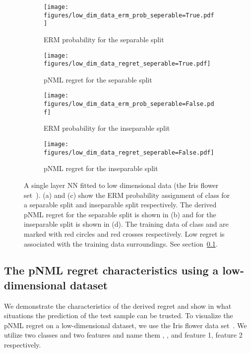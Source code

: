 \documentclass{article}
\def\secref#1{section~\ref{#1}}
\begin{document}
\begin{figure}[tbh]
    \centering
\begin{subfigure}[t]{0.49\linewidth}
    \texttt{[image: figures/low\_dim\_data\_erm\_prob\_seperable=True.pdf]}
    \vspace{-8mm}
    \caption{ERM probability for the separable split\label{fig:syntetic_erm_prob}}
\end{subfigure}
\begin{subfigure}[t]{0.49\linewidth}
    \texttt{[image: figures/low\_dim\_data\_regret\_seperable=True.pdf]}
    \vspace{-8mm}
    \caption{pNML regret for the separable split\ \label{fig:syntetic_regret}}
\end{subfigure}
\begin{subfigure}[t]{0.49\linewidth}
    \texttt{[image: figures/low\_dim\_data\_erm\_prob\_seperable=False.pdf]}
    \vspace{-8mm}
    \caption{ERM probability for the inseparable split\  \label{fig:syntetic_erm_prob_inseparable}}
\end{subfigure}
\begin{subfigure}[t]{0.49\linewidth}
    \texttt{[image: figures/low\_dim\_data\_regret\_seperable=False.pdf]}
    \vspace{-8mm}
    \caption{pNML regret for the inseparable split\ \label{fig:syntetic_regret_inseparable}}
\end{subfigure}
\caption{A single layer NN fitted to low dimensional data (the Iris flower set~\citep{fisher1936use}).
(a) and (c) show the ERM probability assignment of class  for a separable split and inseparable split respectively.
The derived pNML regret for the separable split is shown in (b) and for the inseparable split is shown in (d). The training data of class  and  are marked with red circles and red crosses respectively. 
Low regret is associated with the training data surroundings.
See \secref{sec:low_dim_set}.}
\label{fig:syntetic_sumylation}
\end{figure}

\subsection{The pNML regret characteristics using a low-dimensional dataset} \label{sec:low_dim_set}
We demonstrate the characteristics of the derived regret and show in what situations the prediction of the test sample can be trusted.
To visualize the pNML regret on a low-dimensional dataset, we use the Iris flower data set~\citep{fisher1936use}. We utilize two classes and two features and name them , , and feature 1, feature 2 respectively.
\end{document}

